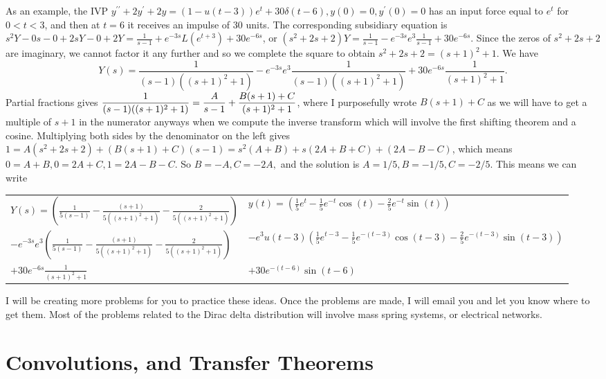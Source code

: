As an example, the IVP $y^{\prime\prime}+2y^\prime +2y=(1-u(t-3))e^t +30\delta(t-6),y(0)=0,y^\prime(0)=0$ has an input force equal to $e^t$ for $0<t<3$, and then at $t=6$ it receives an impulse of 30 units.  The corresponding subsidiary equation is $s^2Y-0s-0+2sY-0+2Y = \frac{1}{s-1}+e^{-3s}L(e^{t+3}) + 30 e^{-6s}$, or $(s^2+2s+2)Y = \frac{1}{s-1}-e^{-3s}e^3\frac{1}{s-1} + 30 e^{-6s}$.  Since the zeros of $s^2+2s+2$ are imaginary, we cannot factor it any further and so we complete the square to obtain $s^2+2s+2 = (s+1)^2+1$.  We have $$Y(s) = \frac{1}{(s-1)((s+1)^2+1)}-e^{-3s}e^3\frac{1}{(s-1)((s+1)^2+1)} + 30 e^{-6s}\frac{1}{(s+1)^2+1}.$$
Partial fractions gives $\displaystyle \frac{1}{(s-1)((s+1)^2+1)} = \frac{A}{s-1}+\frac{B(s+1)+C}{(s+1)^2+1}$, where I purposefully wrote $B(s+1)+C$ as we will have to get a multiple of $s+1$ in the numerator anyways when we compute the inverse transform which will involve the first shifting theorem and a cosine. Multiplying both sides by the denominator on the left gives $1 = A(s^2+2s+2)+(B(s+1)+C)(s-1)=s^2(A+B)+s(2A+B+C)+(2A-B-C)$, which means $0=A+B, 0=2A+C, 1=2A-B-C$.  So $B=-A, C=-2A,$ and the solution is $A=1/5,B=-1/5,C=-2/5$.  This means we can write 
\begin{center}
\begin{tabular}{l|l}
$Y(s)=\left(\frac{1}{5(s-1)}-\frac{(s+1)}{5((s+1)^2+1)}-\frac{2}{5((s+1)^2+1)}\right)$&
$y(t)=\left(\frac{1}{5}e^{t} - \frac{1}{5}e^{-t}\cos(t) - \frac{2}{5}e^{-t}\sin(t)\right)$ \\
$-e^{-3s}e^3\left(\frac{1}{5(s-1)}-\frac{(s+1)}{5((s+1)^2+1)}-\frac{2}{5((s+1)^2+1)}\right)$ &
$- e^3u(t-3)\left(\frac{1}{5}e^{t-3} - \frac{1}{5}e^{-(t-3)}\cos(t-3) - \frac{2}{5}e^{-(t-3)}\sin(t-3)\right)$\\
$+ 30 e^{-6s}\frac{1}{(s+1)^2+1}$&
$+ 30e^{-(t-6)}\sin(t-6)$
\end{tabular}
\end{center}

I will be creating more problems for you to practice these ideas.  Once the problems are made, I will email you and let you know where to get them. Most of the problems related to the Dirac delta distribution will involve mass spring systems, or electrical networks.

\section{Convolutions, and Transfer Theorems}

